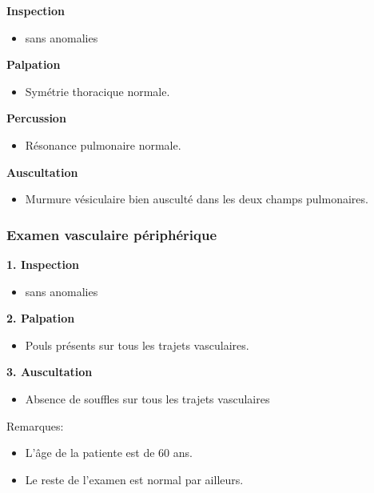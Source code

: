 \documentclass[12pt,a4paper]{article}%
\begin{document}
%
\textbf{Inspection}%
\begin{itemize}%
\setlength{\itemsep}{0pt}%
\item%
sans anomalies%
\end{itemize}%
\textbf{Palpation}%
\begin{itemize}%
\setlength{\itemsep}{0pt}%
\item%
Symétrie thoracique normale.%
\end{itemize}%
\textbf{Percussion}%
\begin{itemize}%
\setlength{\itemsep}{0pt}%
\item%
Résonance pulmonaire normale.%
\end{itemize}%
\textbf{Auscultation}%
\begin{itemize}%
\setlength{\itemsep}{0pt}%
\item%
Murmure vésiculaire bien ausculté dans les deux champs pulmonaires.%
\end{itemize}%
\subsubsection*{Examen vasculaire périphérique}%
\label{ssubsec:Examenvasculairepriphrique}%

%
\textbf{1. Inspection}%
\begin{itemize}%
\setlength{\itemsep}{0pt}%
\item%
sans anomalies%
\end{itemize}%
\textbf{2. Palpation}%
\begin{itemize}%
\setlength{\itemsep}{0pt}%
\item%
Pouls présents sur tous les trajets vasculaires.%
\end{itemize}%
\textbf{3. Auscultation}%
\begin{itemize}%
\setlength{\itemsep}{0pt}%
\item%
Absence de souffles sur tous les trajets vasculaires%
\end{itemize}%
Remarques:%
\begin{itemize}%
\setlength{\itemsep}{0pt}%
\item%
L'âge de la patiente est de 60 ans.%
\item%
Le reste de l'examen est normal par ailleurs.%
\end{itemize}%
%
\vspace*{\baselineskip}%
\end{document}
